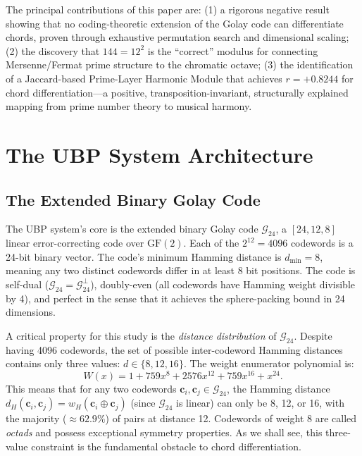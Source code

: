 \documentclass[11pt,a4paper]{article}
\theoremstyle{definition}
\begin{document}
The principal contributions of this paper are: (1) a rigorous negative result showing that no coding-theoretic extension of the Golay code can differentiate chords, proven through exhaustive permutation search and dimensional scaling; (2) the discovery that $144 = 12^2$ is the ``correct'' modulus for connecting Mersenne/Fermat prime structure to the chromatic octave; (3) the identification of a Jaccard-based Prime-Layer Harmonic Module that achieves $r = +0.8244$ for chord differentiation---a positive, transposition-invariant, structurally explained mapping from prime number theory to musical harmony.

\section{The UBP System Architecture}\label{sec:ubp}

\subsection{The Extended Binary Golay Code}\label{sec:golay}

The UBP system's core is the extended binary Golay code $\mathcal{G}_{24}$, a $[24, 12, 8]$ linear error-correcting code over $\mathrm{GF}(2)$. Each of the $2^{12} = 4096$ codewords is a 24-bit binary vector. The code's minimum Hamming distance is $d_{\min} = 8$, meaning any two distinct codewords differ in at least 8 bit positions. The code is self-dual ($\mathcal{G}_{24} = \mathcal{G}_{24}^{\perp}$), doubly-even (all codewords have Hamming weight divisible by 4), and perfect in the sense that it achieves the sphere-packing bound in 24 dimensions.

A critical property for this study is the \emph{distance distribution} of $\mathcal{G}_{24}$. Despite having 4096 codewords, the set of possible inter-codeword Hamming distances contains only three values: $d \in \{8, 12, 16\}$. The weight enumerator polynomial is:
\begin{equation}\label{eq:weight_enum}
W(x) = 1 + 759x^8 + 2576x^{12} + 759x^{16} + x^{24}.
\end{equation}
This means that for any two codewords $\mathbf{c}_i, \mathbf{c}_j \in \mathcal{G}_{24}$, the Hamming distance $d_H(\mathbf{c}_i, \mathbf{c}_j) = w_H(\mathbf{c}_i \oplus \mathbf{c}_j)$ (since $\mathcal{G}_{24}$ is linear) can only be 8, 12, or 16, with the majority ($\approx 62.9\%$) of pairs at distance 12. Codewords of weight 8 are called \emph{octads} and possess exceptional symmetry properties. As we shall see, this three-value constraint is the fundamental obstacle to chord differentiation.
\end{document}

